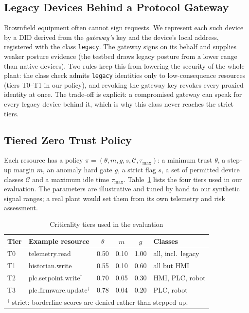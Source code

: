 \subsection{Legacy Devices Behind a Protocol Gateway}\label{sec:legacy}
Brownfield equipment often cannot sign requests. We represent each such device by a DID derived from the \emph{gateway's} key and the device's local address, registered with the class \texttt{legacy}. The gateway signs on its behalf and supplies weaker posture evidence (the testbed draws legacy posture from a lower range than native devices). Two rules keep this from lowering the security of the whole plant: the class check admits \texttt{legacy} identities only to low-consequence resources (tiers T0--T1 in our policy), and revoking the gateway key revokes every proxied identity at once. The trade-off is explicit: a compromised gateway can speak for every legacy device behind it, which is why this class never reaches the strict tiers.

\subsection{Tiered Zero Trust Policy}\label{sec:tiers}
Each resource has a policy $\pi=(\theta,m,g,s,\mathcal{C},\tau_{\max})$: a minimum trust $\theta$, a step-up margin $m$, an anomaly hard gate $g$, a strict flag $s$, a set of permitted device classes $\mathcal{C}$ and a maximum idle time $\tau_{\max}$. Table~\ref{tab:tiers} lists the four tiers used in our evaluation. The parameters are illustrative and tuned by hand to our synthetic signal ranges; a real plant would set them from its own telemetry and risk assessment.

\begin{table}[t]
\centering
\caption{Criticality tiers used in the evaluation}
\label{tab:tiers}
\scriptsize
\begin{tabular}{@{}llcccl@{}}
\toprule
\textbf{Tier} & \textbf{Example resource} & $\theta$ & $m$ & $g$ & \textbf{Classes} \\
\midrule
T0 & telemetry.read & 0.50 & 0.10 & 1.00 & all, incl.\ legacy \\
T1 & historian.write & 0.55 & 0.10 & 0.60 & all but HMI \\
T2 & plc.setpoint.write$^{\dagger}$ & 0.70 & 0.05 & 0.30 & HMI, PLC, robot \\
T3 & plc.firmware.update$^{\dagger}$ & 0.78 & 0.04 & 0.20 & PLC, robot \\
\bottomrule
\multicolumn{6}{l}{$^{\dagger}$ strict: borderline scores are denied rather than stepped up.}
\end{tabular}
\end{table}

